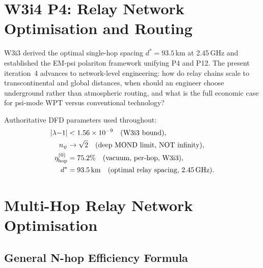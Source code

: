 \documentclass[aps,prd,twocolumn,superscriptaddress]{revtex4-2}
\newcommand{\lambdaone}{|\lambda{-}1|}
\begin{document}
\maketitle

\section{W3i4 P4: Relay Network Optimisation and Routing}
\label{sec:intro}

W3i3 derived the optimal single-hop spacing $d^* = 93.5$\,km at 2.45\,GHz
and established the EM-psi polariton framework unifying P4 and P12.
The present iteration~4 advances to network-level engineering: how do
relay chains scale to transcontinental and global distances, when should
an engineer choose underground rather than atmospheric routing, and what
is the full economic case for psi-mode WPT versus conventional technology?

Authoritative DFD parameters used throughout:
\begin{align}
\lambdaone &< 1.56\times10^{-9}
\quad\text{(W3i3 bound)}, \label{eq:lambda_bound}\\
n_\psi &\to \sqrt{2}
\quad\text{(deep MOND limit, NOT infinity)}, \label{eq:npsi_mond}\\
\eta_\mathrm{hop}^{(0)} &= 75.2\%
\quad\text{(vacuum, per-hop, W3i3)}, \label{eq:eta_hop_vac}\\
d^* &= 93.5\,\mathrm{km}
\quad\text{(optimal relay spacing, 2.45\,GHz)}. \label{eq:dstar}
\end{align}

\section{Multi-Hop Relay Network Optimisation}
\label{sec:multihop}

\subsection{General N-hop Efficiency Formula}
\end{document}
